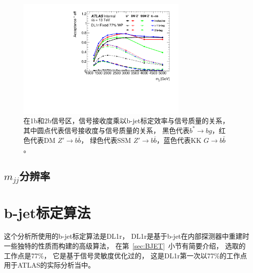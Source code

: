  
 \begin{figure}[thbp]
  \centering
  \includegraphics[width=0.75\textwidth]{figuresDijet/03-BenchmarkSignals/Acceff_DL1r_Fix77.pdf}
  \caption{ 
在1b和2b信号区，信号接收度乘以b-jet标定效率与信号质量的关系，
其中圆点代表信号接收度与信号质量的关系，
黑色代表$b^*\to bg$，红色代表DM $Z\prime \to b\overline{b}$，
绿色代表SSM $Z\prime \to b\overline{b}$，蓝色代表KK $G \rightarrow b\bar{b}$。
}
  \label{fig:ACCPB}
\end{figure}
 
 
 
\subsection{$m_{jj}$分辨率}
\label{sec:DijetMjjBin}




\section{b-jet标定算法}
\label{sec:DijetBtagging}

这个分析所使用的b-jet标定算法是DL1r，
DL1r是基于b-jet在内部探测器中重建时一些独特的性质而构建的高级算法，
在第~\ref{sec:BJET}~小节有简要介绍，
选取的工作点是77\%，
它是基于信号灵敏度优化过的，
这是DL1r第一次以77\%的工作点用于ATLAS的实际分析当中。

